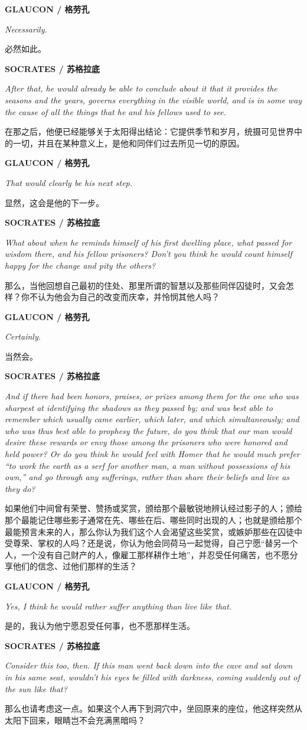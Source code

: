 \documentclass[UTF8]{ctexart}
\newcommand{\speaker}[2]{\par\medskip\noindent\textbf{#1 / #2}\par}
\newcommand{\en}[1]{\noindent\textit{#1}\par}
\newcommand{\zh}[1]{\noindent #1\par}
\begin{document}
\speaker{GLAUCON}{格劳孔}
\en{Necessarily.}
\zh{必然如此。}

\speaker{SOCRATES}{苏格拉底}
\en{After that, he would already be able to conclude about it that it provides the seasons and the years, governs everything in the visible world, and is in some way the cause of all the things that he and his fellows used to see.}
\zh{在那之后，他便已经能够关于太阳得出结论：它提供季节和岁月，统摄可见世界中的一切，并且在某种意义上，是他和同伴们过去所见一切的原因。}

\speaker{GLAUCON}{格劳孔}
\en{That would clearly be his next step.}
\zh{显然，这会是他的下一步。}

\speaker{SOCRATES}{苏格拉底}
\en{What about when he reminds himself of his first dwelling place, what passed for wisdom there, and his fellow prisoners? Don't you think he would count himself happy for the change and pity the others?}
\zh{那么，当他回想自己最初的住处、那里所谓的智慧以及那些同伴囚徒时，又会怎样？你不认为他会为自己的改变而庆幸，并怜悯其他人吗？}

\speaker{GLAUCON}{格劳孔}
\en{Certainly.}
\zh{当然会。}

\speaker{SOCRATES}{苏格拉底}
\en{And if there had been honors, praises, or prizes among them for the one who was sharpest at identifying the shadows as they passed by; and was best able to remember which usually came earlier, which later, and which simultaneously; and who was thus best able to prophesy the future, do you think that our man would desire these rewards or envy those among the prisoners who were honored and held power? Or do you think he would feel with Homer that he would much prefer ``to work the earth as a serf for another man, a man without possessions of his own,'' and go through any sufferings, rather than share their beliefs and live as they do?}
\zh{如果他们中间曾有荣誉、赞扬或奖赏，颁给那个最敏锐地辨认经过影子的人；颁给那个最能记住哪些影子通常在先、哪些在后、哪些同时出现的人；也就是颁给那个最能预言未来的人，那么你认为我们这个人会渴望这些奖赏，或嫉妒那些在囚徒中受尊荣、掌权的人吗？还是说，你认为他会同荷马一起觉得，自己宁愿“替另一个人，一个没有自己财产的人，像雇工那样耕作土地”，并忍受任何痛苦，也不愿分享他们的信念、过他们那样的生活？}

\speaker{GLAUCON}{格劳孔}
\en{Yes, I think he would rather suffer anything than live like that.}
\zh{是的，我认为他宁愿忍受任何事，也不愿那样生活。}

\speaker{SOCRATES}{苏格拉底}
\en{Consider this too, then. If this man went back down into the cave and sat down in his same seat, wouldn't his eyes be filled with darkness, coming suddenly out of the sun like that?}
\zh{那么也请考虑这一点。如果这个人再下到洞穴中，坐回原来的座位，他这样突然从太阳下回来，眼睛岂不会充满黑暗吗？}
\end{document}
